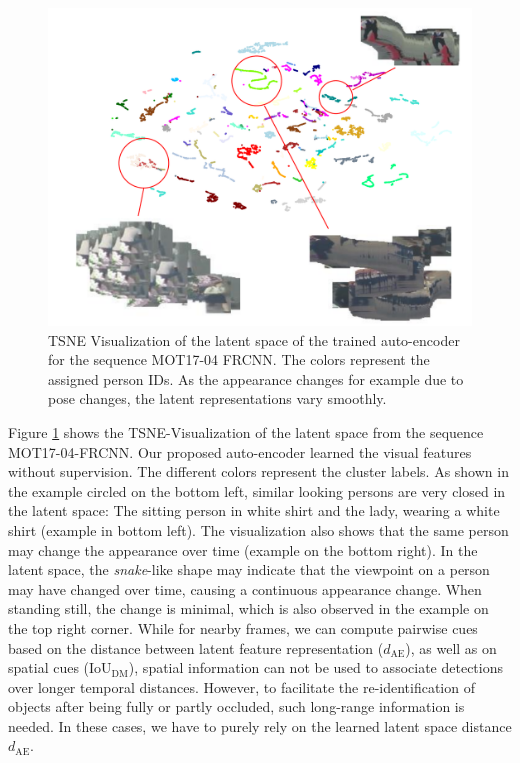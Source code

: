\begin{figure}[!t]
	\begin{center}
		\includegraphics[width=0.7\linewidth]{Fig_5_figure.pdf}
	\end{center}
	\caption{TSNE Visualization of the latent space of the trained auto-encoder for the sequence MOT17-04 FRCNN. The colors represent the assigned person IDs. As the appearance changes for example due to pose changes, the latent representations vary smoothly.}
	\label{fig:graph4}
	
\end{figure}

Figure \ref{fig:graph4} shows the TSNE-Visualization \cite{maaten2008visualizing} of the latent space from the sequence MOT17-04-FRCNN. 
Our proposed auto-encoder learned the visual features without supervision. 
The different colors represent the cluster labels. 
As shown in the example circled on the bottom left, similar looking persons are very closed in the latent space: The sitting person in white shirt and the lady, wearing a white shirt (example in bottom left).
The visualization also shows that the same person may change the appearance over time (example on the bottom right). 
In the latent space, the \textit{snake}-like shape may indicate that the viewpoint on a person may have changed over time, causing a continuous appearance change. 
When standing still, the change is minimal, which is also observed in the example on the top right corner.
While for nearby frames, we can compute pairwise cues based on the distance between latent feature representation ($d_{\mathrm{AE}}$), as well as on spatial cues (IoU$_{\mathrm{DM}}$), spatial information can not be used to associate detections over longer temporal distances. 
However, to facilitate the re-identification of objects after being fully or partly occluded, such long-range information is needed.
In these cases, we have to purely rely on the learned latent space distance $d_{\mathrm{AE}}$. 

